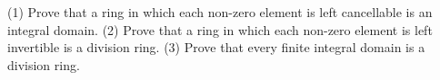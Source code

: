 (1) Prove that a ring in which each non-zero element is left cancellable is an integral domain.
(2) Prove that a ring in which each non-zero element is left invertible is a division ring.
(3) Prove that every finite integral domain is a division ring.

